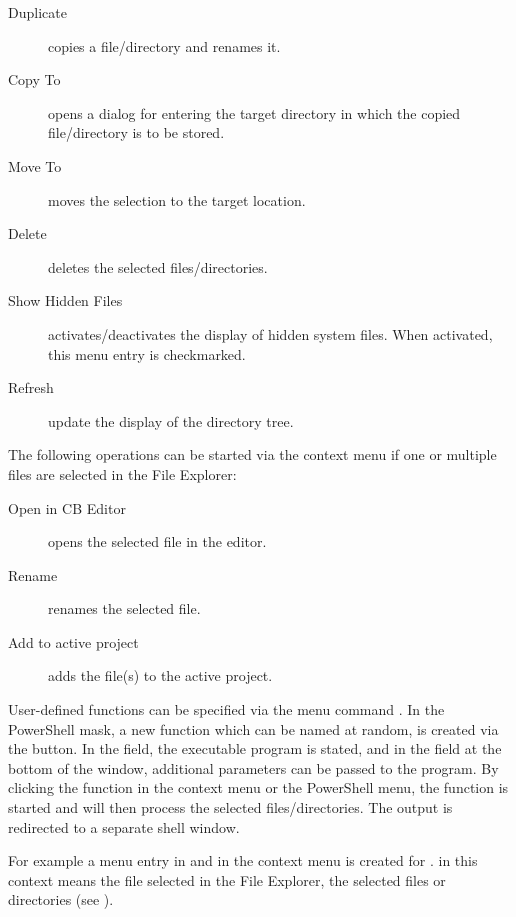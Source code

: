 \begin{description}
\item[Duplicate] copies a file/directory and renames it.
\item[Copy To] opens a dialog for entering the target directory in which the copied file/directory is to be stored.
\item[Move To] moves the selection to the target location.
\item[Delete] deletes the selected files/directories.
\item[Show Hidden Files] activates/deactivates the display of hidden system files. When activated, this menu entry is checkmarked.
\item[Refresh] update the display of the directory tree.
\end{description}

The following operations can be started via the context menu if one or multiple files are selected in the File Explorer:

\begin{description}
\item[Open in CB Editor] opens the selected file in the \codeblocks editor.
\item[Rename] renames the selected file.
\item[Add to active project] adds the file(s) to the active project.
\end{description}


User-defined functions can be specified via the menu command . In the PowerShell mask, a new function which can be named at random, is created via the  button. In the  field, the executable program is stated, and in the field at the bottom of the window, additional parameters can be passed to the program.
By clicking the function in the context menu or the PowerShell menu, the function is started and will then process the selected files/directories. The output is redirected to a separate shell window.

For example a menu entry in  and in the context menu is created for .  in this context means the file selected in the File Explorer,  the selected files or directories (see ).

